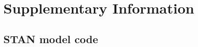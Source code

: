\documentclass[a4,12pt]{article}
\begin{document}





    

\section{Supplementary Information}

    \subsection{STAN model code}
\end{document}
